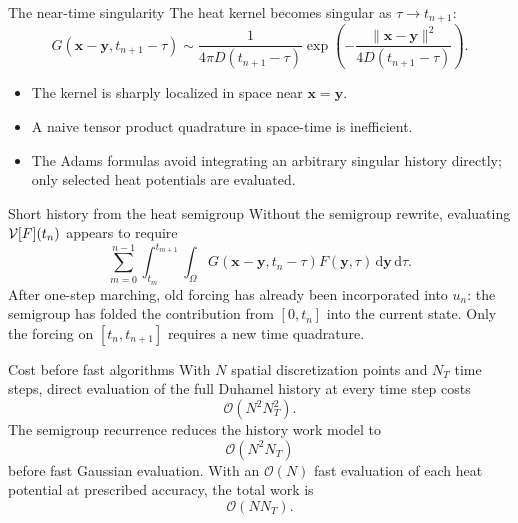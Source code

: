 \documentclass[aspectratio=169,10pt]{beamer}
\newcommand{\dd}{\,\mathrm d}
\newcommand{\x}{\bm{x}}
\newcommand{\y}{\bm{y}}
\begin{document}
\begin{frame}{The near-time singularity}
\small
The heat kernel becomes singular as $\tau\to t_{n+1}$:
\[
  G(\x-\y,t_{n+1}-\tau)
  \sim
  \frac{1}{4\pi D(t_{n+1}-\tau)}
  \exp\left(
  -\frac{\|\x-\y\|^2}{4D(t_{n+1}-\tau)}
  \right).
\]

\begin{itemize}
  \item The kernel is sharply localized in space near $\x=\y$.
  \item A naive tensor product quadrature in space-time is inefficient.
  \item The Adams formulas avoid integrating an arbitrary singular history
  directly; only selected heat potentials are evaluated.
\end{itemize}
\end{frame}

\begin{frame}{Short history from the heat semigroup}
\small
Without the semigroup rewrite, evaluating $\mathcal{V}[F](t_n)$ appears to require
\[
  \sum_{m=0}^{n-1}\int_{t_m}^{t_{m+1}}
  \int_{\Omega}G(\x-\y,t_n-\tau)F(\y,\tau)\dd\y\dd\tau.
\]
After one-step marching, old forcing has already been incorporated into $u_n$:
the semigroup has folded the contribution from $[0,t_n]$ into the current
state. Only the forcing on $[t_n,t_{n+1}]$ requires a new time quadrature.

\end{frame}

\begin{frame}{Cost before fast algorithms}
\small
With $N$ spatial discretization points and $N_T$ time steps, direct evaluation
of the full Duhamel history at every time step costs
\[
  \mathcal{O}(N^2N_T^2).
\]
The semigroup recurrence reduces the history work model to
\[
  \mathcal{O}(N^2N_T)
\]
before fast Gaussian evaluation. With an $\mathcal{O}(N)$ fast evaluation
of each heat potential at prescribed accuracy, the total work is
\[
  \mathcal{O}(N N_T).
\]
\end{frame}
\end{document}

